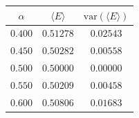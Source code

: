 \begin{tabular}{ccc}
\toprule
$\alpha$ & $\langle E \rangle$ & $\mathrm{var}(\langle E \rangle)$ \\
\midrule
$0.400$ & $0.51278$ & $0.02543$ \\
$0.450$ & $0.50282$ & $0.00558$ \\
$0.500$ & $0.50000$ & $0.00000$ \\
$0.550$ & $0.50209$ & $0.00458$ \\
$0.600$ & $0.50806$ & $0.01683$ \\
\bottomrule
\end{tabular}
